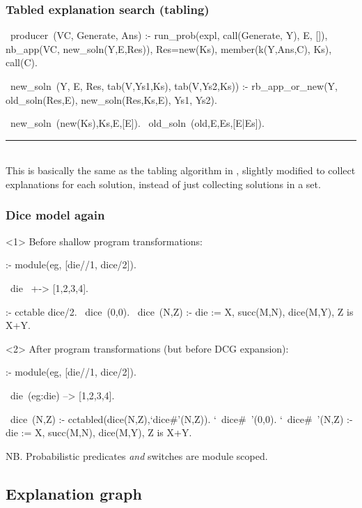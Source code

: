 \documentclass[usenames,dvipsnames]{beamer}
\newenvironment{fframe}[1][untitled]{\begin{frame}[fragile,environment=fframe]\frametitle{{#1}}}{\end{frame}}
\newenvironment{isframe}[1][untitled]{\begin{frame}[fragile=singleslide,environment=isframe]\frametitle{#1}}{\end{frame}}
\begin{document}
\begin{isframe}[Tabled explanation search (tabling)]
\begin{prolog}[xleftmargin=0em,basicstyle=\small]
  ~producer~(VC, Generate, Ans) :-
     run_prob(expl, call(Generate, Y), E, []),
     nb_app(VC, new_soln(Y,E,Res)),
     Res=new(Ks), member(k(Y,Ans,C), Ks), call(C).

  ~new_soln~(Y, E, Res, tab(V,Ys1,Ks), tab(V,Ys2,Ks)) :-
     rb_app_or_new(Y, old_soln(Res,E), new_soln(Res,Ks,E), Ys1, Ys2).

  ~new_soln~(new(Ks),Ks,E,[E]).
  ~old_soln~(old,E,Es,[E|Es]).
\end{prolog}
\vspace{-1.5em}
\rule{\linewidth}{0.4pt}\\
This is basically the same as the tabling algorithm in \citep{Abdallah2017b}, slightly
modified to collect explanations for each solution, instead of just collecting
solutions in a set.
\end{isframe}

\begin{fframe}[Dice model again]
\begin{onlyenv}<1>%
Before shallow program transformations:
\begin{prolog}[columns=fullflexible,morekeywords={[2]{cctable}}]
  :- module(eg, [die//1, dice/2]).

	~die~ +-> [1,2,3,4].

  :- cctable dice/2.
	~dice~(0,0).
	~dice~(N,Z) :-
		die := X,
		succ(M,N), dice(M,Y),
		Z is X+Y.
\end{prolog}
\end{onlyenv}
\begin{onlyenv}<2>%
After program transformations (but before DCG expansion):
\begin{prolog}[columns=fullflexible,morekeywords={[2]{cctable}}]
  :- module(eg, [die//1, dice/2]).

	~die~(eg:die) --> [1,2,3,4].

  ~dice~(N,Z) :- cctabled(dice(N,Z),`dice#'(N,Z)).
	`~dice#~'(0,0).
	`~dice#~'(N,Z) :-
		die := X,
		succ(M,N), dice(M,Y),
		Z is X+Y.
\end{prolog}
\end{onlyenv}
NB. Probabilistic predicates \emph{and} switches are module scoped.
\end{fframe}

\subsection{Explanation graph}
\end{document}

